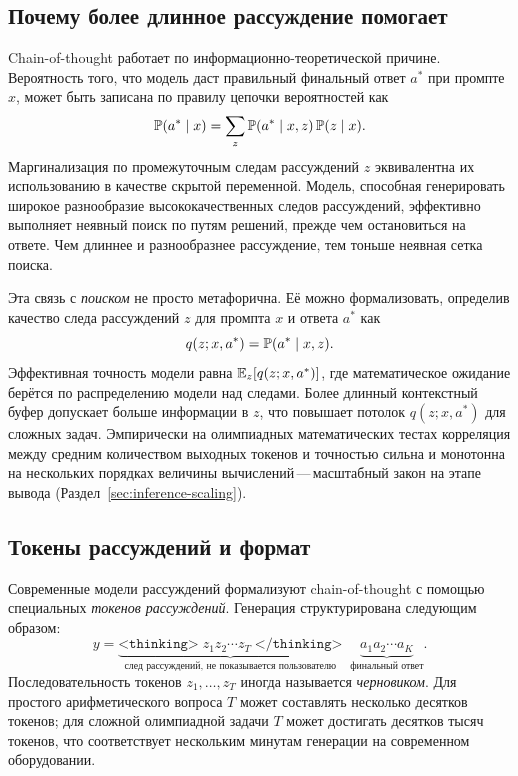 \subsection{Почему более длинное рассуждение помогает}
\label{subsec:why-cot-helps}

Chain-of-thought работает по информационно-теоретической причине.
Вероятность того, что модель даст правильный финальный ответ $a^*$
при промпте $x$, может быть записана по правилу цепочки вероятностей как
\begin{equation}
\label{eq:cot-chain-rule}
\mathbb{P}(a^* \mid x)
  = \sum_{z} \mathbb{P}(a^* \mid x, z)\,\mathbb{P}(z \mid x).
\end{equation}
Маргинализация по промежуточным следам рассуждений $z$ эквивалентна
их использованию в качестве скрытой переменной. Модель, способная генерировать широкое
разнообразие высококачественных следов рассуждений, эффективно выполняет
неявный поиск по путям решений, прежде чем остановиться на ответе.
Чем длиннее и разнообразнее рассуждение, тем тоньше неявная
сетка поиска.

Эта связь с \emph{поиском} не просто
метафорична. Её можно формализовать, определив качество
следа рассуждений $z$ для промпта $x$ и ответа $a^*$ как
\[
q(z; x, a^*) = \mathbb{P}(a^* \mid x, z).
\]
Эффективная точность модели равна $\operatorname{\mathbb{E}}_z[q(z; x, a^*)]$, где
математическое ожидание берётся по распределению модели над следами. Более длинный
контекстный буфер допускает больше информации в $z$, что повышает
потолок $q(z; x, a^*)$ для сложных задач. Эмпирически на
олимпиадных математических тестах корреляция между средним количеством
выходных токенов и точностью сильна и монотонна на нескольких
порядках величины вычислений\,---\,масштабный закон на этапе вывода
(Раздел~\ref{sec:inference-scaling}).

\subsection{Токены рассуждений и формат}
\label{subsec:thinking-tokens}

Современные модели рассуждений формализуют chain-of-thought с помощью специальных
\emph{токенов рассуждений}. Генерация
структурирована следующим образом:
\begin{equation}
\label{eq:thinking-format}
y = \underbrace{\texttt{<thinking>}\; z_1 z_2 \cdots z_T
                \;\texttt{</thinking>}}_{\mbox{след рассуждений, не показывается пользователю}}
    \;\;\underbrace{a_1 a_2 \cdots a_K}_{\mbox{финальный ответ}}.
\end{equation}
Последовательность токенов $z_1, \ldots, z_T$ иногда называется
\emph{черновиком}. Для простого арифметического
вопроса $T$ может составлять несколько десятков токенов; для сложной олимпиадной
задачи $T$ может достигать десятков тысяч токенов, что соответствует
нескольким минутам генерации на современном оборудовании.

